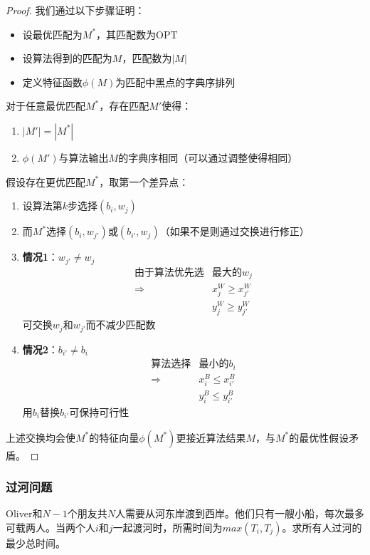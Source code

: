 \documentclass[./../main.tex]{subfiles}
\begin{document}
\begin{proof}
我们通过以下步骤证明：

\begin{itemize}
\item 设最优匹配为$M^*$，其匹配数为$\mathrm{OPT}$
\item 设算法得到的匹配为$M$，匹配数为$|M|$
\item 定义特征函数$\phi(M)$为匹配中黑点的字典序排列
\end{itemize}

对于任意最优匹配$M^*$，存在匹配$M'$使得：
\begin{enumerate}
\item $|M'| = |M^*|$
\item $\phi(M')$与算法输出$M$的字典序相同（可以通过调整使得相同）
\end{enumerate}


假设存在更优匹配$M^*$，取第一个差异点：

\begin{enumerate}
\item 设算法第$k$步选择$(b_i,w_j)$
\item 而$M^*$选择$(b_i,w_{j'})$或$(b_{i'},w_j)$（如果不是则通过交换进行修正）

\item \textbf{情况1}：$w_{j'} \neq w_j$
\begin{align*}
\text{由于算法优先选} & \text{最大的$w_j$} \\
\Rightarrow & x_j^W \geq x_{j'}^W \\
& y_j^W \geq y_{j'}^W
\end{align*}
可交换$w_j$和$w_{j'}$而不减少匹配数

\item \textbf{情况2}：$b_{i'} \neq b_i$
\begin{align*}
\text{算法选择} & \text{最小的$b_i$} \\
\Rightarrow & x_i^B \leq x_{i'}^B \\
& y_i^B \leq y_{i'}^B
\end{align*}
用$b_i$替换$b_{i'}$可保持可行性
\end{enumerate}

上述交换均会使$M^*$的特征向量$\phi(M^*)$更接近算法结果$M$，与$M^*$的最优性假设矛盾。
\end{proof}

\subsubsection{过河问题}
Oliver和$N-1$个朋友共$N$人需要从河东岸渡到西岸。他们只有一艘小船，每次最多可载两人。当两个人$i$和$j$一起渡河时，所需时间为$max(T_i, T_j)$。求所有人过河的最少总时间。
\end{document}
